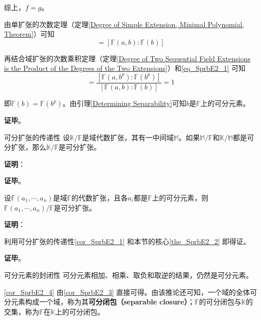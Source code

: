 综上，$f=g$。

由单扩张的次数定理（定理\ref{Degree of Simple Extension, Minimal Polynomial, Theorem}）可知
\begin{equation}
[\mathbb{F}(a, b^p):\mathbb{F}(b^p)] = [\mathbb{F}(a, b):\mathbb{F}(b)]
\end{equation}

再结合域扩张的次数乘积定理（定理\ref{Degree of Two Sequential Field Extensions is the Product of the Degrees of the Two Extensions}）和\autoref{eq_SprbE2_1} 可知
\begin{equation}
[\mathbb{F}(b):\mathbb{F}(b^p)] = \frac{[\mathbb{F}(a, b^p):\mathbb{F}(b^p)]}{[\mathbb{F}(a, b):\mathbb{F}(b)]} = 1
\end{equation}

即$\mathbb{F}(b)=\mathbb{F}(b^p)$。由引理\ref{Determining Separability}可知$b$是$\mathbb{F}$上的可分元素。

\textbf{证毕}。











\begin{corollary}{可分扩张的传递性}\label{cor_SprbE2_1}
设$\mathbb{K}/\mathbb{F}$是域代数扩张，其有一中间域$\mathbb{M}$。如果$\mathbb{M}/\mathbb{F}$和$\mathbb{K}/\mathbb{M}$都是可分扩张，那么$\mathbb{K}/\mathbb{F}$是可分扩张。
\end{corollary}

\textbf{证明}：



\textbf{证毕}。





\begin{corollary}{}\label{cor_SprbE2_3}
设$\mathbb{F}(a_1, \cdots, a_n)$是域$\mathbb{F}$的代数扩张，且各$a_i$都是$\mathbb{F}$上的可分元素，则$\mathbb{F}(a_1, \cdots, a_n)/\mathbb{F}$是可分扩张。
\end{corollary}

\textbf{证明}：

利用可分扩张的传递性\autoref{cor_SprbE2_1} 和本节的核心\autoref{the_SprbE2_2} 即得证。

\textbf{证毕}。





\begin{corollary}{可分元素的封闭性}\label{cor_SprbE2_4}
可分元素相加、相乘、取负和取逆的结果，仍然是可分元素。
\end{corollary}

\autoref{cor_SprbE2_4} 由\autoref{cor_SprbE2_3} 直接可得。由该推论还可知，一个域的全体可分元素构成一个域，称为其\textbf{可分闭包（separable closure）}；$\mathbb{F}$的可分闭包与$\mathbb{K}$的交集，称为$\mathbb{F}$在$\mathbb{K}$上的可分闭包。












